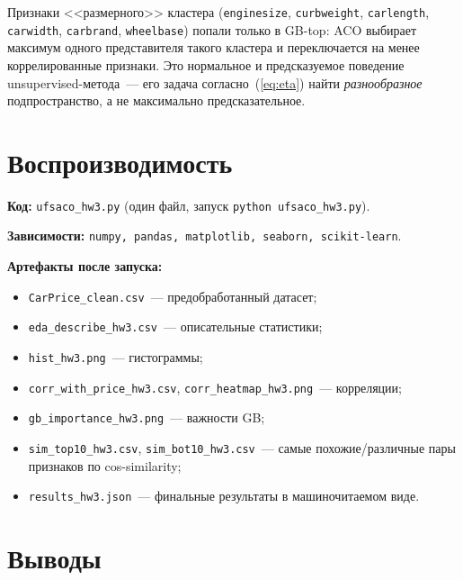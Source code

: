 \documentclass[12pt,a4paper]{article}
\begin{document}
Признаки <<размерного>> кластера (\texttt{enginesize},
\texttt{curbweight}, \texttt{carlength}, \texttt{carwidth},
\texttt{carbrand}, \texttt{wheelbase}) попали только в GB-top:
ACO выбирает максимум одного представителя такого кластера и переключается
на менее коррелированные признаки. Это нормальное и предсказуемое
поведение unsupervised-метода~--- его задача согласно~(\ref{eq:eta})
найти \emph{разнообразное} подпространство, а не максимально
предсказательное.

\section{Воспроизводимость}

\textbf{Код:} \texttt{ufsaco\_hw3.py} (один файл, запуск
\texttt{python ufsaco\_hw3.py}).

\textbf{Зависимости:} \texttt{numpy, pandas, matplotlib, seaborn,
scikit-learn}.

\textbf{Артефакты после запуска:}
\begin{itemize}\setlength\itemsep{0pt}
  \item \texttt{CarPrice\_clean.csv}~--- предобработанный датасет;
  \item \texttt{eda\_describe\_hw3.csv}~--- описательные статистики;
  \item \texttt{hist\_hw3.png}~--- гистограммы;
  \item \texttt{corr\_with\_price\_hw3.csv},
        \texttt{corr\_heatmap\_hw3.png}~--- корреляции;
  \item \texttt{gb\_importance\_hw3.png}~--- важности GB;
  \item \texttt{sim\_top10\_hw3.csv}, \texttt{sim\_bot10\_hw3.csv}~---
        самые похожие/различные пары признаков по cos-similarity;
  \item \texttt{results\_hw3.json}~--- финальные результаты в
        машиночитаемом виде.
\end{itemize}

\section{Выводы}
\end{document}
